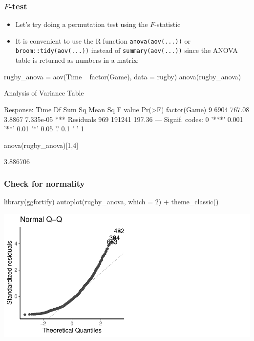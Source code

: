 \documentclass[a4paper]{article}\usepackage[]{graphicx}\usepackage[]{xcolor}
\makeatletter
\def\maxwidth{ %
  \ifdim\Gin@nat@width>\linewidth
    \linewidth
  \else
    \Gin@nat@width
  \fi
}
\makeatother
\begin{document}
\subsubsection{\( F \)-test}
\begin{itemize}
	\item Let's try doing a permutation test using the \( F \)-statistic
	\item It is convenient to use the R function \lstinline|anova(aov(...))| or \lstinline|broom::tidy(aov(...))| instead of \lstinline|summary(aov(...))| since the ANOVA table is returned as numbers in a matrix:
\end{itemize}
\begin{Schunk}
\begin{Sinput}
rugby_anova = aov(Time ~ factor(Game), data = rugby)
anova(rugby_anova)
\end{Sinput}
\begin{Soutput}
Analysis of Variance Table

Response: Time
              Df Sum Sq Mean Sq F value    Pr(>F)    
factor(Game)   9   6904  767.08  3.8867 7.335e-05 ***
Residuals    969 191241  197.36                      
---
Signif. codes:  0 '***' 0.001 '**' 0.01 '*' 0.05 '.' 0.1 ' ' 1
\end{Soutput}
\begin{Sinput}
anova(rugby_anova)[1,4]
\end{Sinput}
\begin{Soutput}
[1] 3.886706
\end{Soutput}
\end{Schunk}
\subsubsection{Check for normality}
\begin{Schunk}
\begin{Sinput}
library(ggfortify)
autoplot(rugby_anova, which = 2) +
theme_classic()
\end{Sinput}


{\centering \includegraphics[width=\maxwidth]{figure/listings-unnamed-chunk-270-1} 

}

\end{Schunk}
\end{document}
